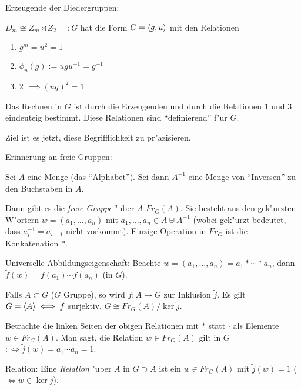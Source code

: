 \example Erzeugende der Diedergruppen:{
  $D_m\cong Z_m \rtimes Z_2=:G $ hat die Form $G={\left\langle g,u\right\rangle}$ mit den Relationen 
  \begin{enumerate}
    \item $g^m=u^2=1$
    \item $\phi_u(g):=ugu^{-1}=g^{-1}$
    \item 2 $\implies (ug)^2=1$
    \end{enumerate}
  Das Rechnen in $G$ ist durch die Erzeugenden und durch die Relationen 
  1 und 3 eindeuteig bestimmt. Diese Relationen sind ``definierend'' f"ur $G$.
  
  Ziel ist es jetzt, diese Begrifflichkeit zu pr"azisieren.
  }
\remark Erinnerung an freie Gruppen:{
  Sei $A$ eine Menge (das ``Alphabet''). Sei dann $A^{-1}$ eine Menge
  von ``Inversen'' zu den Buchstaben in $A$.
  
  Dann gibt es die \emph{freie Gruppe} "uber $A$
  $Fr_G(A)$. Sie besteht aus den gek"urzten W"ortern $w=(a_1,\dots,a_n)$ mit
  $a_1,\dots,a_n\in A\uplus A^{-1}$ (wobei gek"urzt bedeutet, dass
  $a_i^{-1}=a_{i+1}$ nicht vorkommt). Einzige Operation in $Fr_G$ ist die
  Konkatenation $*$.
  
  Universelle Abbildungseigenschaft:
  Beachte $w=(a_1,\dots,a_n)=a_1* \cdots * a_n$, dann 
  $\tilde f(w)=f(a_1)\cdots f(a_n)$ (in $G$).
  
  Falls $A\subset G$ ($G$ Gruppe), so wird $f:A\to G$ zur Inklusion $\tilde j$.
  Es gilt $G={\left\langle A\right\rangle}\iff f$ surjektiv. $G\cong Fr_G(A)/\ker \tilde j$.
  
  Betrachte die linken Seiten der obigen Relationen mit $*$ statt $\cdot$ als
  Elemente $w\in Fr_G(A)$. Man sagt, die Relation $w\in Fr_G(A)$ gilt in $G$
  $:\iff \tilde j(w)=a_1\cdots a_n=1$.
  }
 Relation:{
  Eine \emph{Relation} "uber $A$ in $G\supset A$ ist ein $w\in Fr_G(A)$ mit 
  $\tilde j(w)=1$ ($\iff w\in \ker \tilde j$).
  }
